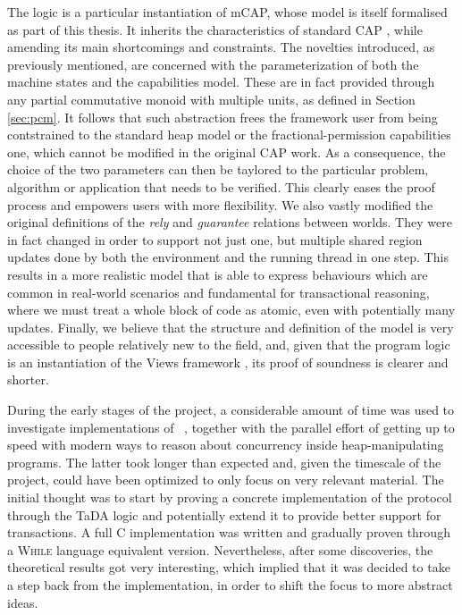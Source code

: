 The logic is a particular instantiation of mCAP, whose model is itself formalised as part of this thesis. It inherits the characteristics of standard CAP \cite{cap}, while amending its main shortcomings and constraints. The novelties introduced, as previously mentioned, are concerned with the parameterization of both the machine states and the capabilities model. These are in fact provided through any partial commutative monoid with multiple units, as defined in Section \ref{sec:pcm}. It follows that such abstraction frees the framework user from being contstrained to the standard heap model or the fractional-permission capabilities \cite{fractional} one, which cannot be modified in the original CAP work. As a consequence, the choice of the two parameters can then be taylored to the particular problem, algorithm or application that needs to be verified. This clearly eases the proof process and empowers users with more flexibility. We also vastly modified the original definitions of the \textit{rely} and \textit{guarantee} relations between worlds. They were in fact changed in order to support not just one, but multiple shared region updates done by both the environment and the running thread in one step. This results in a more realistic model that is able to express behaviours which are common in real-world scenarios and fundamental for transactional reasoning, where we must treat a whole block of code as atomic, even with potentially many updates. Finally, we believe that the structure and definition of the model is very accessible to people relatively new to the field, and, given that the program logic is an instantiation of the Views framework \cite{views}, its proof of soundness is clearer and shorter.

	During the early stages of the project, a considerable amount of time was used to investigate implementations of \tpl\ \cite{implementation2pl}, together with the parallel effort of getting up to speed with modern ways to reason about concurrency inside heap-manipulating programs. The latter took longer than expected and, given the timescale of the project, could have been optimized to only focus on very relevant material. The initial thought was to start by proving a concrete implementation of the protocol through the TaDA logic \cite{tada} and potentially extend it to provide better support for transactions. A full C implementation was written and gradually proven through a \textsc{While} language equivalent version. Nevertheless, after some discoveries, the theoretical results got very interesting, which implied that it was decided to take a step back from the implementation, in order to shift the focus to more abstract ideas.


